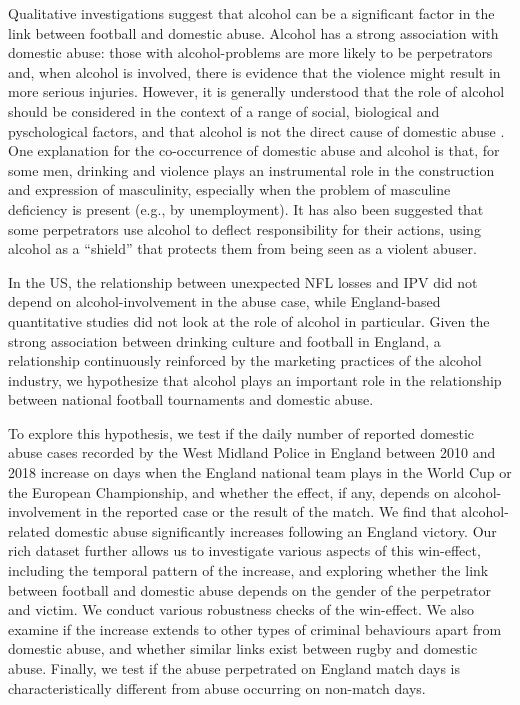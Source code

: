 \documentclass[12pt, letterpaper]{article}
\begin{document}
Qualitative investigations suggest that alcohol can be a significant factor in the link between football and domestic abuse. Alcohol has a strong association with domestic abuse\autocite{Peralta2010}: those with alcohol-problems are more likely to be perpetrators and, when alcohol is involved, there is evidence that the violence might result in more serious injuries. However, it is generally understood that the role of alcohol should be considered in the context of a range of social, biological and pyschological factors, and that alcohol is not the direct cause of domestic abuse \autocite{Javaid2015,Peralta2010}. One explanation for the co-occurrence of domestic abuse and alcohol is that, for some men, drinking and violence plays an instrumental role in the construction and expression of masculinity, especially when the problem of masculine deficiency is present (e.g., by unemployment)\autocite{Peralta2010}. It has also been suggested that some perpetrators use alcohol to deflect responsibility for their actions, using alcohol as a ``shield'' that protects them from being seen as a violent abuser\autocite{Javaid2015}.  

In the US, the relationship between unexpected NFL losses and IPV did not depend on alcohol-involvement in the abuse case\autocite{Card2011}, while England-based quantitative studies did not look at the role of alcohol in particular. Given the strong association between drinking culture and football in England\autocite{Dixon2014}, a relationship continuously reinforced by the marketing practices of the alcohol industry\autocite{Gornall2014}, we hypothesize that alcohol plays an important role in the relationship between national football tournaments and domestic abuse.

To explore this hypothesis, we test if the daily number of reported domestic abuse cases recorded by the West Midland Police in England between 2010 and 2018 increase on days when the England national team plays in the World Cup or the European Championship, and whether the effect, if any, depends on alcohol-involvement in the reported case or the result of the match. We find that alcohol-related domestic abuse significantly increases following an England victory. Our rich dataset further allows us to investigate various aspects of this win-effect, including the temporal pattern of the increase, and exploring whether the link between football and domestic abuse depends on the gender of the perpetrator and victim. We conduct various robustness checks of the win-effect. We also examine if the increase extends to other types of criminal behaviours apart from domestic abuse, and whether similar links exist between rugby and domestic abuse. Finally, we test if the abuse perpetrated on England match days is characteristically different from abuse occurring on non-match days.
\end{document}

